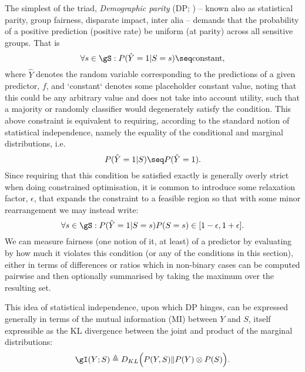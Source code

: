 %
The simplest of the triad, \emph{Demographic parity} (DP; \cite{zemel2013learning,
feldman2015certifying}) -- known also as statistical parity, group fairness, disparate impact,
inter alia -- demands that the probability of a positive prediction (positive rate) be uniform
(at parity) across all sensitive groups. 
%
That is
%
\begin{equation}
    \forall s \in \gS: P( \hat{Y} = 1 | S = s ) \seq \text{constant},
\end{equation}
%
where \(\hat{Y}\) denotes the random variable corresponding to the predictions of a given
predictor, \(f\), and `constant` denotes some placeholder constant value, noting that this could be
any arbitrary value and does not take into account utility, such that a majority or randomly
classifier would degenerately satisfy the condition. 
%
This above constraint is equivalent to requiring, according to the standard notion of statistical
independence, namely the equality of the conditional and marginal distributions, i.e.
%
\begin{equation}
    P( \hat{Y} = 1 | S) \seq P( \hat{Y} = 1 ).
\end{equation}
%
%
Since requiring that this condition be satisfied exactly is generally overly strict when doing
constrained optimisation, it is common to introduce some relaxation factor, \(\epsilon\), that
expands the constraint to a feasible region so that with some minor rearrangement we may instead
write:
%
\begin{equation}
    \forall s \in \gS: P(\hat{Y}=1|S=s) P(S=s) \in [ 1 - \epsilon, 1 + \epsilon ]. 
%
\end{equation}
%
We can measure fairness (one notion of it, at least) of a predictor by evaluating by how much it
violates this condition (or any of the conditions in this section), either in terms of differences
or ratios  which in non-binary cases can be computed pairwise and then optionally summarised by
taking the maximum over the resulting set.

%
%
This idea of statistical independence, upon which DP hinges, can be expressed generally in terms of
the mutual information (MI) between \(Y\) and \(S\), itself expressible as the KL divergence
between the joint and product of the marginal distributions:
%
\begin{equation}
    \gI(Y;S) \triangleq D_{KL} \Bigl( P(Y, S) \Vert P(Y) \otimes P(S) \Bigr).
\end{equation}


